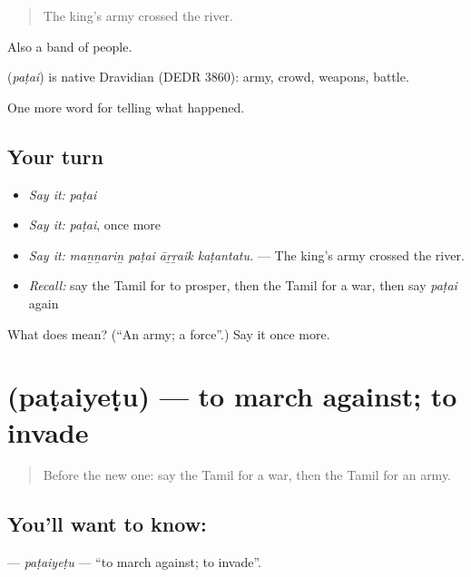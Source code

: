 \begin{quote}
The king's army crossed the river.
\end{quote}

Also a band of people.

\begin{cousinweb}
\textbf{} (\emph{paṭai}) is native Dravidian (DEDR 3860): army, crowd, weapons, battle.
\end{cousinweb}

\begin{grammarlens}[title={What you've built}]
One more word for telling what happened.
\end{grammarlens}

\subsection*{Your turn}
\begin{itemize}
\raggedright
  \item \emph{Say it:} \emph{paṭai}
  \item \emph{Say it:} \emph{paṭai}, once more
  \item \emph{Say it:} \emph{maṉṉariṉ paṭai āṟṟaik kaṭantatu.} — The king's army crossed the river.
  \item \emph{Recall:} say the Tamil for to prosper, then the Tamil for a war, then say \emph{paṭai} again
\end{itemize}

\begin{tcolorbox}[breakable,colback=teal!4,colframe=teal!35!black,title={Before you move on}]
What does  mean? (\textquotedblleft{}An army; a force\textquotedblright{}.) Say it once more.
\end{tcolorbox}
\section[\texorpdfstring{\ta{படையெடு} (paṭaiyeṭu)}{படையெடு (paṭaiyeṭu)}]{ (paṭaiyeṭu) — to march against; to invade}

\label{lesson:TA-C332-pataiyetu}



\begin{quote}
Before the new one: say the Tamil for a war, then the Tamil for an army.
\end{quote}

\subsection*{You'll want to know: }
\textbf{} — \emph{paṭaiyeṭu} — \textquotedblleft{}to march against; to invade\textquotedblright{}.

